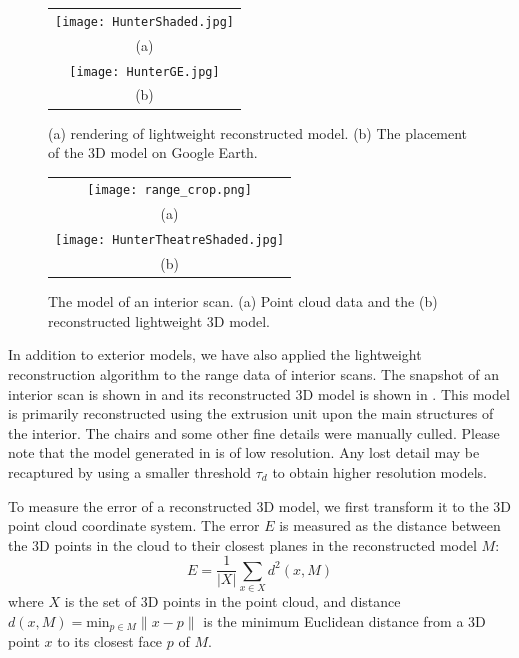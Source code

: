 \begin{figure}[htbp]
\begin{center}
\begin{tabular}{c}
\texttt{[image: HunterShaded.jpg]} \\
(a) \\
\texttt{[image: HunterGE.jpg]} \\
(b)
\end{tabular}
\end{center}
\caption{ (a) rendering of lightweight reconstructed model.
(b) The placement of the 3D model on Google Earth.}
\label{fig:OUT}
\end{figure}

\begin{figure}[htbp]
\begin{center}
\begin{tabular}{c}
\texttt{[image: range\_crop.png]} \\
(a) \\
\texttt{[image: HunterTheatreShaded.jpg]} \\
(b)
\end{tabular}
\end{center}
\caption{The model of an interior scan. (a) Point cloud data and the
(b) reconstructed lightweight 3D model.}
\label{fig:IN}
\end{figure}

In addition to exterior models, we have also applied the lightweight
reconstruction algorithm to the range data of interior scans.
The snapshot of an interior scan is shown in 
and its reconstructed 3D model is shown in .
This model is primarily reconstructed using the extrusion unit
upon the main structures of the interior.
The chairs and some other fine details were manually culled.
Please note that the model generated in  is of low resolution.
Any lost detail may be recaptured by using a smaller threshold $\tau_d$
to obtain higher resolution models.

To measure the error of a reconstructed 3D model, we first transform it
to the 3D point cloud coordinate system.
The error $E$ is measured as the distance between the 3D points in the cloud
to their closest planes in the reconstructed model $M$:
\begin{equation}
E = \frac{1}{|X|}\sum_{x\in{X}}{d^2(x, M)}
\label{eq:em}
\end{equation}
where $X$ is the set of 3D points in the point cloud, and distance
$d(x, M) = \text{min}_{p \in M}\lVert x - p \lVert$ is the minimum
Euclidean distance from a 3D point $x$ to its closest face $p$ of $M$.

